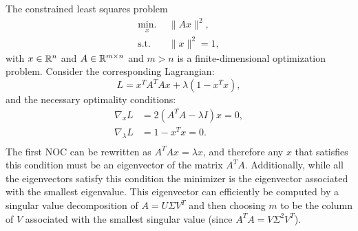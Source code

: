 \begin{example} \label{ex:constlsq}
\theoremstyle{definition}
The constrained least squares problem 
\begin{equation*}
\begin{split}
\underset{x}{\text{min.}} \:\:& \lVert A x \rVert^2, \\
    \text{s.t.}\:\:& \lVert x \rVert^2 = 1,
\end{split}
\end{equation*}
with $x\in \mathbb{R}^n$ and $A \in \mathbb{R}^{m \times n}$ and $m > n$ is a finite-dimensional optimization problem. Consider the corresponding Lagrangian:
\begin{equation*}
L = x^T A^TAx + \lambda (1 - x^Tx),
\end{equation*}
and the necessary optimality conditions:
\begin{equation*}
\begin{split}
\nabla_x L &= 2(A^TA - \lambda I)x = 0, \\
\nabla_\lambda L &= 1 - x^Tx = 0. \\
\end{split}
\end{equation*}
The first NOC can be rewritten as $A^TA x = \lambda x$, and therefore any $x$ that satisfies this condition must be an eigenvector of the matrix $A^TA$. Additionally, while all the eigenvectors satisfy this condition the minimizer is the eigenvector associated with the smallest eigenvalue.
This eigenvector can efficiently be computed by a singular value decomposition of $A = U\Sigma V^T$ and then choosing $m$ to be the column of $V$ associated with the smallest singular value (since $A^TA = V\Sigma^2 V^T$).
\end{example}

